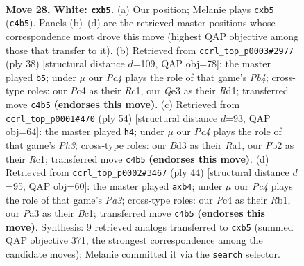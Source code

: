 \documentclass[11pt]{article}
\begin{document}
\clearpage

\begin{figure}[p]\centering
\begin{subfigure}{0.46\textwidth}\centering
\resizebox{\linewidth}{!}{%
\newchessgame
\chessboard[
  setfen={r1bq1rk1/2pn1pb1/3p1n2/1p1P3p/p1P4P/P2BQ1P1/1PN5/RNB2RK1 w - - 0 28},
  showmover=false,
  pgfstyle=straightmove, color=movearrow, markmove={c4-b5}
]}
\caption{}
\end{subfigure}\hfill
\begin{subfigure}{0.46\textwidth}\centering
\resizebox{\linewidth}{!}{%
\newchessgame
\chessboard[
  setfen={b1r2rk1/1q1nbpp1/1p2pn1p/p7/1P1NP3/PQ4P1/1B1N1PBP/2RR2K1 w - - 4 20},
  showmover=false,
  pgfstyle=straightmove, color=movearrow, markmove={b4-b5}
]}
\caption{}
\end{subfigure}
\\[4pt]
\begin{subfigure}{0.46\textwidth}\centering
\resizebox{\linewidth}{!}{%
\newchessgame
\chessboard[
  setfen={1r1qr1k1/1p3pb1/p2pnnb1/P7/1NPPp1p1/1NB1P1PP/5Q2/R1R2BK1 w - - 2 28},
  showmover=false,
  pgfstyle=straightmove, color=movearrow, markmove={h3-h4}
]}
\caption{}
\end{subfigure}\hfill
\begin{subfigure}{0.46\textwidth}\centering
\resizebox{\linewidth}{!}{%
\newchessgame
\chessboard[
  setfen={b2rrbk1/2qn1pp1/2pp1n1p/1p6/1p1PP3/P4NNP/2B1QPP1/1RB1R1K1 w - - 0 23},
  showmover=false,
  pgfstyle=straightmove, color=movearrow, markmove={a3-b4}
]}
\caption{}
\end{subfigure}
\caption{\textbf{Move 28, White: \texttt{cxb5}.} (a) Our position; Melanie plays \texttt{cxb5} (\texttt{c4b5}). Panels (b)--(d) are the retrieved master positions whose correspondence most drove this move (highest QAP objective among those that transfer to it). (b) Retrieved from \texttt{ccrl\_top\_p0003\#2977} (ply 38) [structural distance $d$=109, QAP obj=78]: the master played \texttt{b5}; under $\mu$ our \emph{Pc4} plays the role of that game's \emph{Pb4}; cross-type roles: our \emph{P}c4 as their \emph{R}c1, our \emph{Q}e3 as their \emph{R}d1; transferred move \texttt{c4b5} \textbf{(endorses this move)}. (c) Retrieved from \texttt{ccrl\_top\_p0001\#470} (ply 54) [structural distance $d$=93, QAP obj=64]: the master played \texttt{h4}; under $\mu$ our \emph{Pc4} plays the role of that game's \emph{Ph3}; cross-type roles: our \emph{B}d3 as their \emph{R}a1, our \emph{P}b2 as their \emph{R}c1; transferred move \texttt{c4b5} \textbf{(endorses this move)}. (d) Retrieved from \texttt{ccrl\_top\_p0002\#3467} (ply 44) [structural distance $d$=95, QAP obj=60]: the master played \texttt{axb4}; under $\mu$ our \emph{Pc4} plays the role of that game's \emph{Pa3}; cross-type roles: our \emph{P}c4 as their \emph{R}b1, our \emph{P}a3 as their \emph{B}c1; transferred move \texttt{c4b5} \textbf{(endorses this move)}. Synthesis: 9 retrieved analogs transferred to \texttt{cxb5} (summed QAP objective 371, the strongest correspondence among the candidate moves); Melanie committed it via the \texttt{search} selector.}
\label{fig:thought-m54}
\end{figure}
\end{document}
